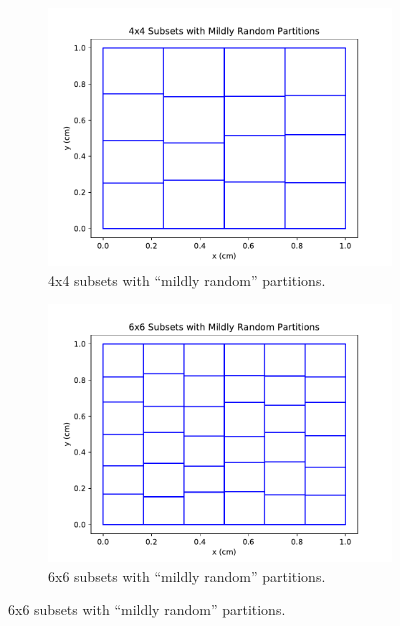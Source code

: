 \documentclass[times,final]{elsarticle}
\begin{document}
\begin{figure}[H]
\centering
\begin{subfigure}[b]{0.45\textwidth}
  \includegraphics[width=\textwidth]{../Dissertation/cut_line_files/4_mild_random.pdf}
  \caption{4x4 subsets with ``mildly random'' partitions.}
  \label{4mildrandom}
\end{subfigure}
\begin{subfigure}[b]{0.45\textwidth}
  \includegraphics[width=\textwidth]{../Dissertation/cut_line_files/6_mild_random.pdf}
  \caption{6x6 subsets with ``mildly random'' partitions.}
  \label{6mildrandom}
\end{subfigure}


\end{figure}
\end{document}
